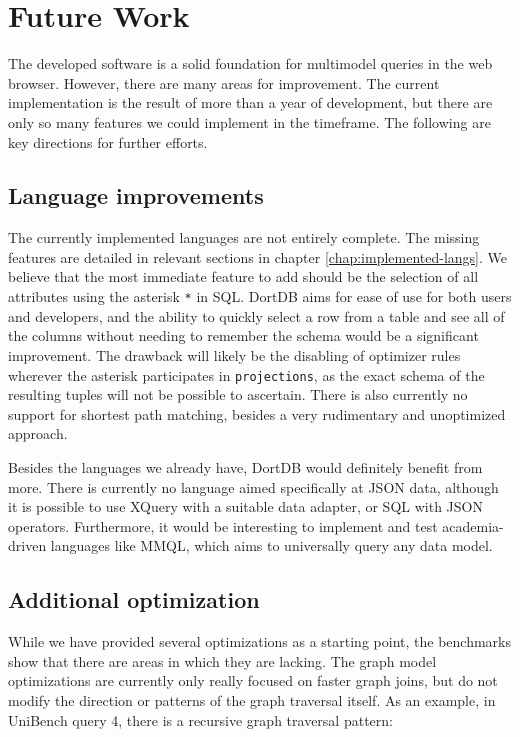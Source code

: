 \chapter{Future Work}
\label{chap:future-work}

The developed software is a solid foundation for multimodel queries in the web browser. However, there are many areas for improvement. The current implementation is the result of more than a year of development, but there are only so many features we could implement in the timeframe. The following are key directions for further efforts.

\section{Language improvements}

The currently implemented languages are not entirely complete. The missing features are detailed in relevant sections in chapter \ref{chap:implemented-langs}. We believe that the most immediate feature to add should be the selection of all attributes using the asterisk \texttt{*} in SQL. DortDB aims for ease of use for both users and developers, and the ability to quickly select a row from a table and see all of the columns without needing to remember the schema would be a significant improvement. The drawback will likely be the disabling of optimizer rules wherever the asterisk participates in \texttt{projections}, as the exact schema of the resulting tuples will not be possible to ascertain. There is also currently no support for shortest path matching, besides a very rudimentary and unoptimized approach.

Besides the languages we already have, DortDB would definitely benefit from more. There is currently no language aimed specifically at JSON data, although it is possible to use XQuery with a suitable data adapter, or SQL with JSON operators. Furthermore, it would be interesting to implement and test academia-driven languages like MMQL\cite{DBLP:journals/is/KoupilCH25}, which aims to universally query any data model.

\section{Additional optimization}

While we have provided several optimizations as a starting point, the benchmarks show that there are areas in which they are lacking. The graph model optimizations are currently only really focused on faster graph joins, but do not modify the direction or patterns of the graph traversal itself. As an example, in UniBench query 4, there is a recursive graph traversal pattern:

